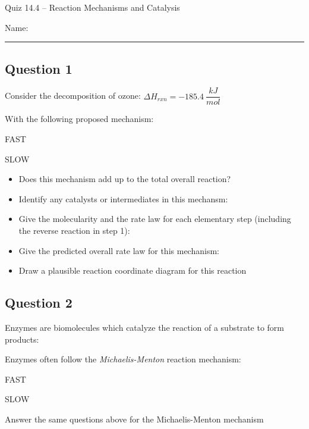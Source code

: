 \documentclass[11pt, letterpaper]{memoir}
\begin{document}
	\begin{center}
		{\large	Quiz 14.4 -- Reaction Mechanisms and Catalysis}
	\end{center}
	{\large Name: \rule[-1mm]{4in}{.1pt} 
	
	\noindent
	
	\subsection*{Question 1}
	Consider the decomposition of ozone:  \hspace{1em} $\Delta H_{rxn} = -185.4~\dfrac{kJ}{mol}$
	
	\noindent With the following proposed mechanism:
	
	 \hspace{1em} FAST
	
	 \hspace{1em} SLOW
	
	\begin{itemize}
		\item Does this mechanism add up to the total overall reaction?
		\item Identify any catalysts or intermediates in this mechansm:
		\item Give the molecularity and the rate law for each elementary step (including the reverse reaction in step 1):
		\item Give the predicted overall rate law for this mechanism:
		\item Draw a plausible reaction coordinate diagram for this reaction
	\end{itemize}
	
	\vspace{7em}
	\subsection*{Question 2}
	Enzymes are biomolecules which catalyze the reaction of a substrate to form products: 
	
	\noindent Enzymes often follow the \emph{Michaelis-Menton} reaction mechanism:
	
	 \hspace{1em} FAST
	
	 \hspace{1em} SLOW
	
	\noindent Answer the same questions above for the Michaelis-Menton mechanism
	\newpage
	\pagestyle{empty}
	\addtocounter{page}{-1}
}
\end{document}
